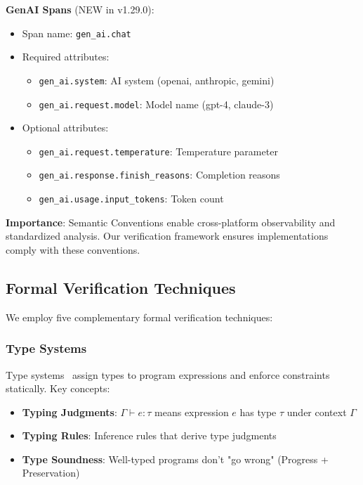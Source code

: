 \textbf{GenAI Spans} (NEW in v1.29.0):

\begin{itemize}
\item Span name: \texttt{gen\_ai.chat}
\item Required attributes:
  \begin{itemize}
  \item \texttt{gen\_ai.system}: AI system (openai, anthropic, gemini)
  \item \texttt{gen\_ai.request.model}: Model name (gpt-4, claude-3)
  \end{itemize}
\item Optional attributes:
  \begin{itemize}
  \item \texttt{gen\_ai.request.temperature}: Temperature parameter
  \item \texttt{gen\_ai.response.finish\_reasons}: Completion reasons
  \item \texttt{gen\_ai.usage.input\_tokens}: Token count
  \end{itemize}
\end{itemize}

\textbf{Importance}: Semantic Conventions enable cross-platform observability and standardized analysis. Our verification framework ensures implementations comply with these conventions.

\subsection{Formal Verification Techniques}
\label{sec:formal-techniques}

We employ five complementary formal verification techniques:

\subsubsection{Type Systems}
\label{sec:type-systems}

Type systems~\cite{pierce2002types} assign types to program expressions and enforce constraints statically. Key concepts:

\begin{itemize}
\item \textbf{Typing Judgments}: $\Gamma \vdash e : \tau$ means expression $e$ has type $\tau$ under context $\Gamma$
\item \textbf{Typing Rules}: Inference rules that derive type judgments
\item \textbf{Type Soundness}: Well-typed programs don't "go wrong" (Progress + Preservation)
\end{itemize}

